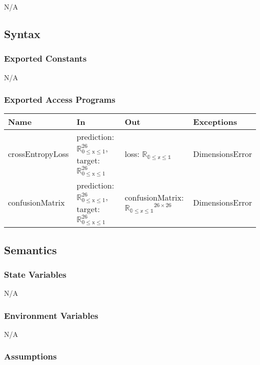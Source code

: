 \documentclass[12pt, titlepage]{article}
\begin{document}
N/A


\subsection{Syntax}

\subsubsection{Exported Constants}

N/A

\subsubsection{Exported Access Programs}

\begin{center}
\begin{tabular}{p{4cm} p{4cm} p{4cm} p{2cm}}
\hline
\textbf{Name} & \textbf{In} & \textbf{Out} & \textbf{Exceptions} \\
\hline
crossEntropyLoss & prediction: $\mathbb{R}_{\text{0} \leq \text{x} \leq \text{1}}^{26}$, target: $\mathbb{R}_{\text{0} \leq \text{x} \leq \text{1}}^{26}$ & loss: $\mathbb{R_{\text{0} \leq \text{x} \leq \text{1}}}$ & DimensionsError \\
confusionMatrix & prediction: $\mathbb{R}_{\text{0} \leq \text{x} \leq \text{1}}^{26}$, target: $\mathbb{R}_{\text{0} \leq \text{x} \leq \text{1}}^{26}$ & confusionMatrix: $\mathbb{R_{\text{0} \leq \text{x} \leq \text{1}}}^{26 \times 26}$ & DimensionsError \\
\hline
\end{tabular}
\end{center}

\subsection{Semantics}

\subsubsection{State Variables}

N/A

\subsubsection{Environment Variables}

N/A

\subsubsection{Assumptions}
\end{document}
